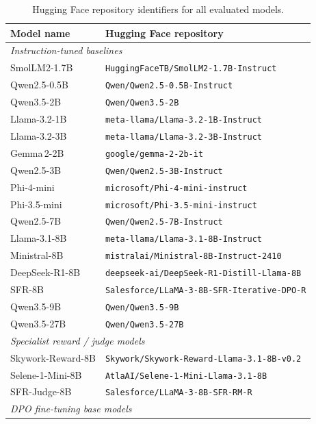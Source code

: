 \documentclass{article}
\theoremstyle{plain}
\theoremstyle{definition}
\theoremstyle{remark}
\begin{document}
\begin{table}[h]
\centering
\caption{Hugging Face repository identifiers for all evaluated models.}
\label{tab:hf-links}
\small
\setlength{\tabcolsep}{4pt}
\begin{tabular}{ll}
\toprule
\textbf{Model name} & \textbf{Hugging Face repository} \\
\midrule
\multicolumn{2}{l}{\textit{Instruction-tuned baselines}} \\
SmolLM2-1.7B        & \texttt{HuggingFaceTB/SmolLM2-1.7B-Instruct} \\
Qwen2.5-0.5B        & \texttt{Qwen/Qwen2.5-0.5B-Instruct} \\
Qwen3.5-2B          & \texttt{Qwen/Qwen3.5-2B} \\
Llama-3.2-1B        & \texttt{meta-llama/Llama-3.2-1B-Instruct} \\
Llama-3.2-3B        & \texttt{meta-llama/Llama-3.2-3B-Instruct} \\
Gemma\,2-2B         & \texttt{google/gemma-2-2b-it} \\
Qwen2.5-3B          & \texttt{Qwen/Qwen2.5-3B-Instruct} \\
Phi-4-mini          & \texttt{microsoft/Phi-4-mini-instruct} \\
Phi-3.5-mini        & \texttt{microsoft/Phi-3.5-mini-instruct} \\
Qwen2.5-7B          & \texttt{Qwen/Qwen2.5-7B-Instruct} \\
Llama-3.1-8B        & \texttt{meta-llama/Llama-3.1-8B-Instruct} \\
Ministral-8B        & \texttt{mistralai/Ministral-8B-Instruct-2410} \\
DeepSeek-R1-8B      & \texttt{deepseek-ai/DeepSeek-R1-Distill-Llama-8B} \\
SFR-8B              & \texttt{Salesforce/LLaMA-3-8B-SFR-Iterative-DPO-R} \\
Qwen3.5-9B          & \texttt{Qwen/Qwen3.5-9B} \\
Qwen3.5-27B         & \texttt{Qwen/Qwen3.5-27B} \\
\midrule
\multicolumn{2}{l}{\textit{Specialist reward / judge models}} \\
Skywork-Reward-8B  & \texttt{Skywork/Skywork-Reward-Llama-3.1-8B-v0.2} \\
Selene-1-Mini-8B    & \texttt{AtlaAI/Selene-1-Mini-Llama-3.1-8B} \\
SFR-Judge-8B       & \texttt{Salesforce/LLaMA-3-8B-SFR-RM-R} \\
\midrule
\multicolumn{2}{l}{\textit{DPO fine-tuning base models}} \\

\end{tabular}
\end{table}
\end{document}
